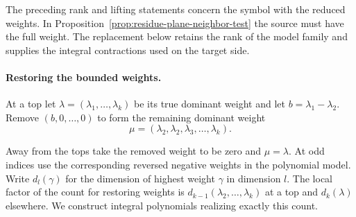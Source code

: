 The preceding rank and lifting statements concern the symbol
with the reduced weights. In Proposition~\ref{prop:residue-plane-neighbor-test}
the source must have the full weight. The replacement below
retains the rank of the model family and supplies the integral
contractions used on the target side.

\paragraph{Restoring the bounded weights.}
\label{par:plane-middle-weights}
\hypertarget{source-plane-middle-weights}{}
At a top let \(\lambda=(\lambda_1,\ldots,\lambda_k)\) be its
true dominant weight and let \(b=\lambda_1-\lambda_2\). Remove
\((b,0,\ldots,0)\) to form the remaining dominant weight
\[
 \mu=(\lambda_2,\lambda_2,\lambda_3,\ldots,\lambda_k).
\]

Away from the tops take the removed weight to be zero and
\(\mu=\lambda\). At odd indices use the corresponding reversed
negative weights in the polynomial model. Write \(d_l(\gamma)\)
for the dimension of highest weight \(\gamma\) in dimension \(l\).
The local factor of the count for restoring weights is
\(d_{k-1}(\lambda_2,\ldots,\lambda_k)\) at a top and
\(d_k(\lambda)\) elsewhere. We construct integral polynomials
realizing exactly this count.

